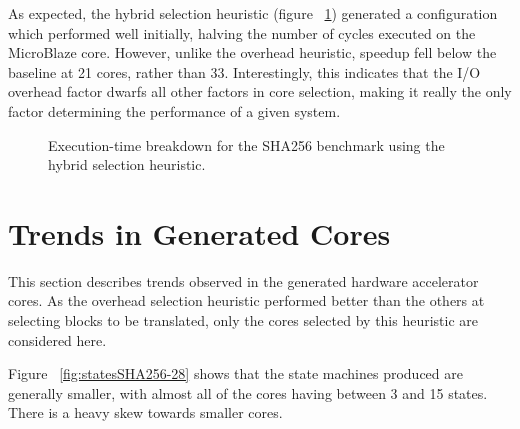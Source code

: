 \documentclass{UoYCSproject}
\begin{document}
As expected, the hybrid selection heuristic (figure ~\ref{fig:breakdownHybridSHA256}) generated
a configuration which performed well initially, halving the number of cycles executed on the MicroBlaze core.
However, unlike the overhead heuristic, speedup fell below the baseline at 21 cores, rather than 33.
Interestingly, this indicates that the I/O overhead factor dwarfs all other factors in core selection, making
it really the only factor determining the performance of a given system.

\begin{figure}[H]
\caption{Execution-time breakdown for the SHA256 benchmark using the hybrid selection heuristic.}
\label{fig:breakdownHybridSHA256}
\end{figure}

\section{Trends in Generated Cores}
\label{section:resultsTrends}

This section describes trends observed in the generated hardware accelerator cores.
As the overhead selection heuristic performed better than the others at selecting blocks to be
translated, only the cores selected by this heuristic are considered here.

Figure ~\ref{fig:statesSHA256-28} shows that the state machines produced are generally smaller,
with almost all of the cores having between 3 and 15 states. There is a heavy skew towards smaller
cores.
\end{document}
